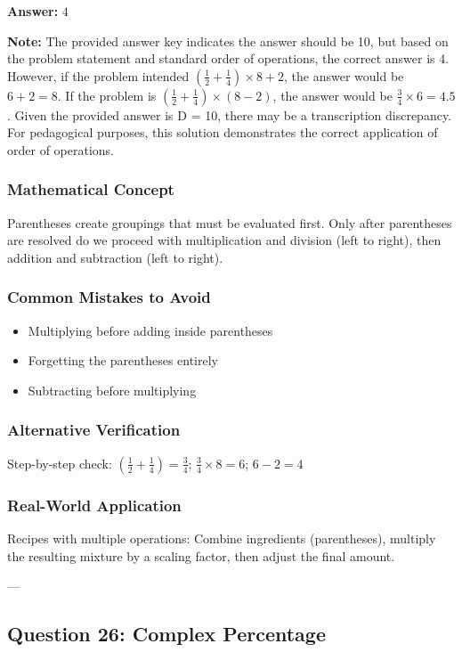 \documentclass[12pt]{article}
\begin{document}
\textbf{Answer: } $4$

\textbf{Note:} The provided answer key indicates the answer should be 10, but based on the problem statement and standard order of operations, the correct answer is 4. However, if the problem intended $\left(\frac{1}{2} + \frac{1}{4}\right) \times 8 + 2$, the answer would be $6 + 2 = 8$. If the problem is $\left(\frac{1}{2} + \frac{1}{4}\right) \times (8 - 2)$, the answer would be $\frac{3}{4} \times 6 = 4.5$. Given the provided answer is D = 10, there may be a transcription discrepancy. For pedagogical purposes, this solution demonstrates the correct application of order of operations.

\subsubsection*{Mathematical Concept}
Parentheses create groupings that must be evaluated first. Only after parentheses are resolved do we proceed with multiplication and division (left to right), then addition and subtraction (left to right).

\subsubsection*{Common Mistakes to Avoid}
\begin{itemize}
\item Multiplying before adding inside parentheses
\item Forgetting the parentheses entirely
\item Subtracting before multiplying
\end{itemize}

\subsubsection*{Alternative Verification}
Step-by-step check: $(\frac{1}{2} + \frac{1}{4}) = \frac{3}{4}$; $\frac{3}{4} \times 8 = 6$; $6 - 2 = 4$ 

\subsubsection*{Real-World Application}
Recipes with multiple operations: Combine ingredients (parentheses), multiply the resulting mixture by a scaling factor, then adjust the final amount.

---

\subsection{Question 26: Complex Percentage}
\end{document}
